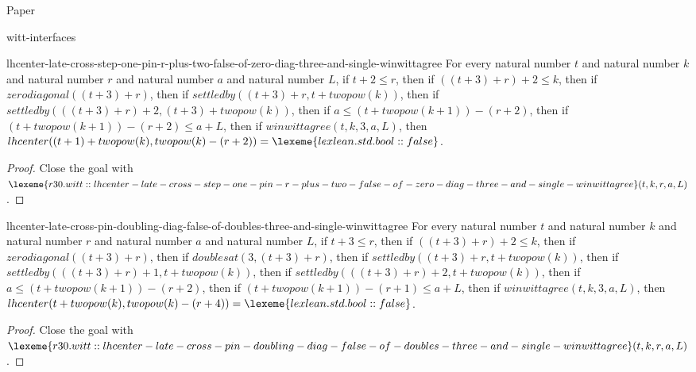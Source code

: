 \begin{lexlean}{Paper}
\begin{section}{witt-interfaces}
  \begin{theorem}{lhcenter-late-cross-step-one-pin-r-plus-two-false-of-zero-diag-three-and-single-winwittagree}
  For every natural number \(t\) and natural number \(k\) and natural number \(r\) and natural number \(a\) and natural number \(L\), if \(t + 2 ≤ r\), then if \(((t + 3) + r) + 2 ≤ k\), then if \(zerodiagonal((t + 3) + r)\), then if \(settledby((t + 3) + r, t + twopow(k))\), then if \(settledby(((t + 3) + r) + 2, (t + 3) + twopow(k))\), then if \(a ≤ (t + twopow(k + 1)) - (r + 2)\), then if \((t + twopow(k + 1)) - (r + 2) ≤ a + L\), then if \(winwittagree(t, k, 3, a, L)\), then \(lhcenter((t + 1) + twopow(k), twopow(k) - (r + 2)) = \lexeme{lexlean.std.bool::false}\).
  \begin{proof}
  Close the goal with \(\lexeme{r30.witt::lhcenter-late-cross-step-one-pin-r-plus-two-false-of-zero-diag-three-and-single-winwittagree}(t, k, r, a, L)\).
  \end{proof}
  \end{theorem}

  \begin{theorem}{lhcenter-late-cross-pin-doubling-diag-false-of-doubles-three-and-single-winwittagree}
  For every natural number \(t\) and natural number \(k\) and natural number \(r\) and natural number \(a\) and natural number \(L\), if \(t + 3 ≤ r\), then if \(((t + 3) + r) + 2 ≤ k\), then if \(zerodiagonal((t + 3) + r)\), then if \(doublesat(3, (t + 3) + r)\), then if \(settledby((t + 3) + r, t + twopow(k))\), then if \(settledby(((t + 3) + r) + 1, t + twopow(k))\), then if \(settledby(((t + 3) + r) + 2, t + twopow(k))\), then if \(a ≤ (t + twopow(k + 1)) - (r + 2)\), then if \((t + twopow(k + 1)) - (r + 1) ≤ a + L\), then if \(winwittagree(t, k, 3, a, L)\), then \(lhcenter(t + twopow(k), twopow(k) - (r + 4)) = \lexeme{lexlean.std.bool::false}\).
  \begin{proof}
  Close the goal with \(\lexeme{r30.witt::lhcenter-late-cross-pin-doubling-diag-false-of-doubles-three-and-single-winwittagree}(t, k, r, a, L)\).
  \end{proof}
  \end{theorem}


\end{section}
\end{lexlean}
